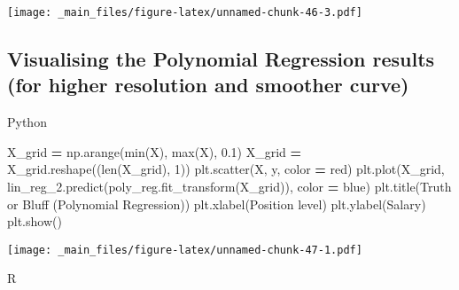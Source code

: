 \documentclass[
]{book}
\newenvironment{Shaded}{\begin{snugshade}}{\end{snugshade}}
\newcommand{\BuiltInTok}[1]{#1}
\newcommand{\DecValTok}[1]{\textcolor[rgb]{0.00,0.00,0.81}{#1}}
\newcommand{\FloatTok}[1]{\textcolor[rgb]{0.00,0.00,0.81}{#1}}
\newcommand{\NormalTok}[1]{#1}
\newcommand{\OperatorTok}[1]{\textcolor[rgb]{0.81,0.36,0.00}{\textbf{#1}}}
\newcommand{\StringTok}[1]{\textcolor[rgb]{0.31,0.60,0.02}{#1}}
\theoremstyle{definition}
\theoremstyle{definition}
\theoremstyle{definition}
\theoremstyle{definition}
\theoremstyle{remark}
\begin{document}
\texttt{[image: \_main\_files/figure-latex/unnamed-chunk-46-3.pdf]}

\hypertarget{visualising-the-polynomial-regression-results-for-higher-resolution-and-smoother-curve}{%
\subsection{Visualising the Polynomial Regression results (for higher resolution and smoother curve)}\label{visualising-the-polynomial-regression-results-for-higher-resolution-and-smoother-curve}}

Python

\begin{Shaded}
\begin{Highlighting}[]
\NormalTok{X\_grid }\OperatorTok{=}\NormalTok{ np.arange(}\BuiltInTok{min}\NormalTok{(X), }\BuiltInTok{max}\NormalTok{(X), }\FloatTok{0.1}\NormalTok{)}
\NormalTok{X\_grid }\OperatorTok{=}\NormalTok{ X\_grid.reshape((}\BuiltInTok{len}\NormalTok{(X\_grid), }\DecValTok{1}\NormalTok{))}
\NormalTok{plt.scatter(X, y, color }\OperatorTok{=} \StringTok{\textquotesingle{}red\textquotesingle{}}\NormalTok{)}
\NormalTok{plt.plot(X\_grid, lin\_reg\_2.predict(poly\_reg.fit\_transform(X\_grid)), color }\OperatorTok{=} \StringTok{\textquotesingle{}blue\textquotesingle{}}\NormalTok{)}
\NormalTok{plt.title(}\StringTok{\textquotesingle{}Truth or Bluff (Polynomial Regression)\textquotesingle{}}\NormalTok{)}
\NormalTok{plt.xlabel(}\StringTok{\textquotesingle{}Position level\textquotesingle{}}\NormalTok{)}
\NormalTok{plt.ylabel(}\StringTok{\textquotesingle{}Salary\textquotesingle{}}\NormalTok{)}
\NormalTok{plt.show()}
\end{Highlighting}
\end{Shaded}

\texttt{[image: \_main\_files/figure-latex/unnamed-chunk-47-1.pdf]}

R
\end{document}
